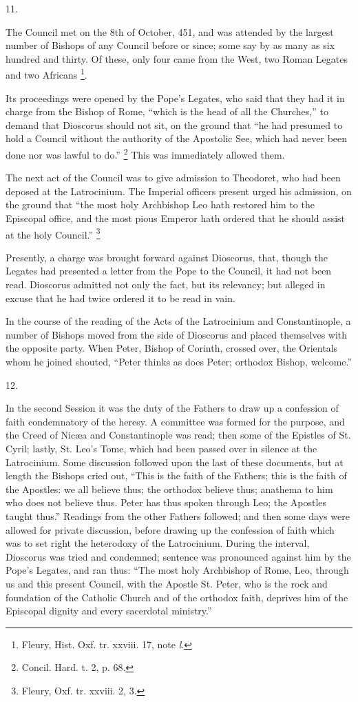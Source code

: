 11.

The Council met on the 8th of October, 451, and was attended by the
largest number of Bishops of any Council before or since; some say by
as many as six hundred and thirty. Of these, only four came from the
West, two Roman Legates and two Africans \footnote{Fleury, Hist. Oxf. tr. xxviii. 17, note \emph{l}.}.

Its proceedings were opened by the Pope's Legates, who said that
they had it in charge from the Bishop of Rome, ``which is the head
of all the Churches,'' to demand that Dioscorus should not sit, on
the ground that ``he had presumed to hold a Council without the
authority of the Apostolic See, which had never been done nor was
lawful to do.'' \footnote{Concil. Hard. t. 2, p. 68.}
This was immediately allowed them.

The next act of the Council was to give admission to Theodoret, who
had been deposed at the Latrocinium. The Imperial officers present
urged his admission, on the ground that ``the most holy Archbishop
Leo hath restored him to the Episcopal office, and the most pious
Emperor hath ordered that he should assist at the holy Council.''
\footnote{Fleury, Oxf. tr. xxviii. 2, 3.}

Presently, a charge was brought forward against Dioscorus, that,
though the Legates had presented a letter from the Pope to the
Council, it had not been read. Dioscorus admitted not only the fact,
but its relevancy; but alleged in excuse that he had twice ordered it
to be read in vain.

In the course of the reading of the Acts of the Latrocinium and
Constantinople, a number of Bishops moved from the side of Dioscorus
and placed themselves with the opposite party. When Peter, Bishop of
Corinth, crossed over, the Orientals whom he joined shouted,
``Peter thinks as does Peter; orthodox Bishop, welcome.''

12.

In the second Session it was the duty of the Fathers to draw up a
confession of faith condemnatory of the heresy. A committee was formed
for the purpose, and the Creed of Nicæa and Constantinople was read;
then some of the Epistles of St. Cyril; lastly, St. Leo's Tome, which
had been passed over in silence at the Latrocinium. Some discussion
followed upon the last of these documents, but at length the Bishops
cried out, ``This is the faith of the Fathers; this is the faith
of the Apostles: we all believe thus; the orthodox believe thus;
anathema to him who does not believe thus. Peter has thus spoken
through Leo; the Apostles taught thus.'' Readings from the other
Fathers followed; and then some days were allowed for private
discussion, before drawing up the confession of faith which was to set
right the heterodoxy of the Latrocinium. During the interval,
Dioscorus was tried and condemned; sentence was pronounced against him
by the Pope's Legates, and ran thus: ``The most holy Archbishop of
Rome, Leo, through us and this present Council, with the Apostle St.
Peter, who is the rock and foundation of the Catholic Church and of
the orthodox faith, deprives him of the Episcopal dignity and every
sacerdotal ministry.''

